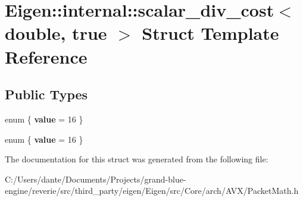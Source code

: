 \hypertarget{struct_eigen_1_1internal_1_1scalar__div__cost_3_01double_00_01true_01_4}{}\section{Eigen\+::internal\+::scalar\+\_\+div\+\_\+cost$<$ double, true $>$ Struct Template Reference}
\label{struct_eigen_1_1internal_1_1scalar__div__cost_3_01double_00_01true_01_4}
\subsection*{Public Types}
\begin{DoxyCompactItemize}
\item 
\mbox{\label{struct_eigen_1_1internal_1_1scalar__div__cost_3_01double_00_01true_01_4_a2d56b08c01672759fba5d8be9f10ca31}} 
enum \{ {\bfseries value} = 16
 \}
\item 
\mbox{\label{struct_eigen_1_1internal_1_1scalar__div__cost_3_01double_00_01true_01_4_ae45de22672a82a18fcc70a3fcec7c665}} 
enum \{ {\bfseries value} = 16
 \}
\end{DoxyCompactItemize}


The documentation for this struct was generated from the following file\+:\begin{DoxyCompactItemize}
\item 
C\+:/\+Users/dante/\+Documents/\+Projects/grand-\/blue-\/engine/reverie/src/third\+\_\+party/eigen/\+Eigen/src/\+Core/arch/\+A\+V\+X/Packet\+Math.\+h\end{DoxyCompactItemize}
